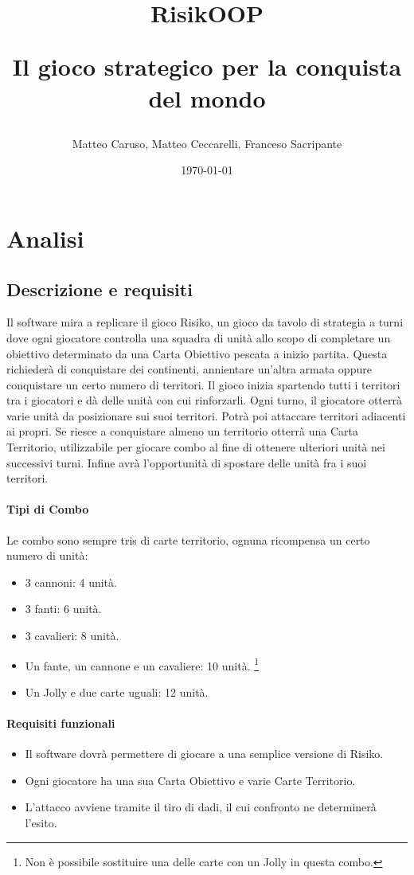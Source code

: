 \documentclass[a4paper,12pt]{report}
\title{
RisikOOP \\
\begin{large}
Il gioco strategico per la conquista del mondo
\end{large}
}
\author{Matteo Caruso, Matteo Ceccarelli, Franceso Sacripante}
\date{\today}
\begin{document}
\maketitle

\tableofcontents

\chapter{Analisi}

\section{Descrizione e requisiti}

Il software mira a replicare il gioco Risiko, un gioco da tavolo di strategia a turni dove ogni giocatore controlla una squadra di unità allo scopo di completare un obiettivo determinato da una Carta Obiettivo pescata a inizio partita.
Questa richiederà di conquistare dei continenti, annientare un'altra armata oppure conquistare un certo numero di territori.
Il gioco inizia spartendo tutti i territori tra i giocatori e dà delle unità con cui rinforzarli.
Ogni turno, il giocatore otterrà varie unità da posizionare sui suoi territori.
Potrà poi attaccare territori adiacenti ai propri.
Se riesce a conquistare almeno un territorio otterrà una Carta Territorio, utilizzabile per giocare combo al fine di ottenere ulteriori unità nei successivi turni.
Infine avrà l'opportunità di spostare delle unità fra i suoi territori.

\subsubsection{Tipi di Combo}
Le combo sono sempre tris di carte territorio, ognuna ricompensa un certo numero di unità:
\begin{itemize}
	\item 3 cannoni: 4 unità.
	\item 3 fanti: 6 unità.
	\item 3 cavalieri: 8 unità.
	\item Un fante, un cannone e un cavaliere: 10 unità. \footnote{Non è possibile sostituire una delle carte con un Jolly in questa combo.}
	\item Un Jolly e due carte uguali: 12 unità.
\end{itemize}

\subsubsection{Requisiti funzionali}
\begin{itemize}
	\item Il software dovrà permettere di giocare a una semplice versione di Risiko.
	\item Ogni giocatore ha una sua Carta Obiettivo e varie Carte Territorio.
	\item L'attacco avviene tramite il tiro di dadi, il cui confronto ne determinerà l'esito.
\end{itemize}
\end{document}
